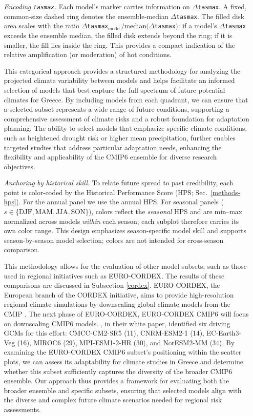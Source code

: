 \documentclass[pdflatex,sn-chicago]{sn-jnl}%
\theoremstyle{thmstyleone}%
\theoremstyle{thmstyletwo}%
\theoremstyle{thmstylethree}%
\begin{document}
\noindent\textit{Encoding \texttt{tasmax}.} Each model’s marker carries information on \(\Delta\)\texttt{tasmax}. A fixed, common-size dashed ring denotes the ensemble-median \(\Delta\)\texttt{tasmax}. The filled disk area scales with the ratio \(\Delta\)\texttt{tasmax}\(_{\text{model}}\)/median\((\Delta\)\texttt{tasmax}\()\): if a model’s \(\Delta\)\texttt{tasmax} exceeds the ensemble median, the filled disk extends beyond the ring; if it is smaller, the fill lies inside the ring. This provides a compact indication of the relative amplification (or moderation) of hot conditions.

This categorical approach provides a structured methodology for analyzing the projected climate variability between models and helps facilitate an informed selection of models that best capture the full spectrum of future potential climates for Greece. By including models from each quadrant, we can ensure that a selected subset represents a wide range of future conditions, supporting a comprehensive assessment of climate risks and a robust foundation for adaptation planning. The ability to select models that emphasize specific climate conditions, such as heightened drought risk or higher mean precipitation, further enables targeted studies that address particular adaptation needs, enhancing the flexibility and applicability of the CMIP6 ensemble for diverse research objectives. 

\noindent\textit{Anchoring by historical skill.} To relate future spread to past credibility, each point is color-coded by the Historical Performance Score (HPS; Sec.~\ref{methods-hps}). For the annual panel we use the annual HPS. For seasonal panels (\(s\in\{\mathrm{DJF},\mathrm{MAM},\mathrm{JJA},\mathrm{SON}\}\)), colors reflect the \emph{seasonal} HPS and are min--max normalized across models \emph{within} each season; each subplot therefore carries its own color range. This design emphasizes season-specific model skill and supports season-by-season model selection; colors are not intended for cross-season comparison.

This methodology allows for the evaluation of other model subsets, such as those used in regional initiatives such as EURO-CORDEX. The results of these comparisons are discussed in Subsection \ref{cordex}. EURO-CORDEX, the European branch of the CORDEX initiative, aims to provide high-resolution regional climate simulations by downscaling global climate models from the CMIP \citep{Jacob2013}. The next phase of EURO-CORDEX, EURO-CORDEX CMIP6 will focus on downscaling CMIP6 models. \citet{euro-cordex}, in their white paper, identified six driving GCMs for this effort: CMCC-CM2-SR5 (11), CNRM-ESM2-1 (14), EC-Earth3-Veg (16), MIROC6 (29), MPI-ESM1-2-HR (30), and NorESM2-MM (34). By examining the EURO-CORDEX CMIP6 subset's positioning within the scatter plots, we can assess its adaptability for climate studies in Greece and determine whether this subset sufficiently captures the diversity of the broader CMIP6 ensemble. Our approach thus provides a framework for evaluating both the broader ensemble and specific subsets, ensuring that selected models align with the diverse and complex future climate scenarios needed for regional risk assessments.
\end{document}
